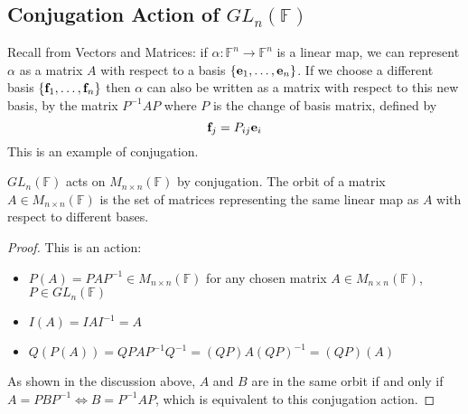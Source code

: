 \subsection{Conjugation Action of $GL_n(\mathbb F)$}
Recall from Vectors and Matrices: if $\alpha\colon \mathbb F^n \to \mathbb F^n$ is a linear map, we can represent $\alpha$ as a matrix $A$ with respect to a basis $\{ \vb e_1, \dots, \vb e_n \}$. If we choose a different basis $\{ \vb f_1, \dots, \vb f_n \}$ then $\alpha$ can also be written as a matrix with respect to this new basis, by the matrix $P^{-1}AP$ where $P$ is the change of basis matrix, defined by
\[ \vb f_j = P_{ij}\vb e_i \]
This is an example of conjugation.
\begin{proposition}
	$GL_n(\mathbb F)$ acts on $M_{n \times n}(\mathbb F)$ by conjugation. The orbit of a matrix $A \in M_{n \times n}(\mathbb F)$ is the set of matrices representing the same linear map as $A$ with respect to different bases.
\end{proposition}
\begin{proof}
	This is an action:
	\begin{itemize}
		\item $P(A) = PAP^{-1} \in M_{n \times n}(\mathbb F)$ for any chosen matrix $A \in M_{n \times n}(\mathbb F)$, $P \in GL_n(\mathbb F)$
		\item $I(A) = IAI^{-1} = A$
		\item $Q(P(A)) = QPAP^{-1}Q^{-1} = (QP)A(QP)^{-1} = (QP)(A)$
	\end{itemize}
	As shown in the discussion above, $A$ and $B$ are in the same orbit if and only if $A = PBP^{-1} \iff B = P^{-1}AP$, which is equivalent to this conjugation action.
\end{proof}

